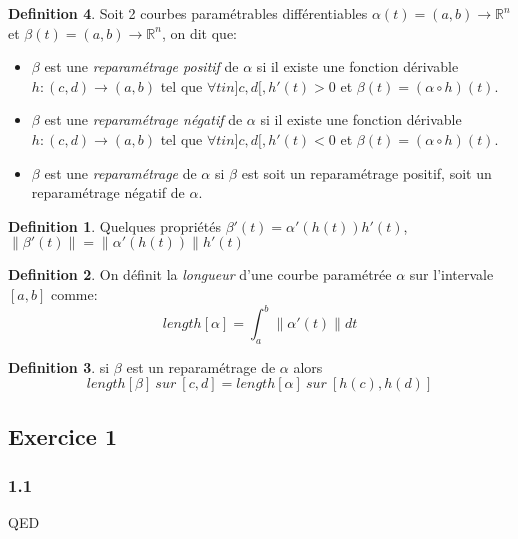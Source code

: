 \documentclass[]{book}
\theoremstyle{definition}
\newtheorem{defn}{Definition}
\newcommand{\bb}[1]{\mathbb{#1}}
\newcommand{\R}{\bb{R}}
\begin{document}
\begin{defn}
Soit 2 courbes param\'etrables diff\'erentiables $\alpha(t) = (a,b) \to \R^n$ et $\beta(t) = (a,b) \to \R^n$, on dit que:
\begin{itemize}
\item $\beta$ est une \emph{reparam\'etrage positif} de $\alpha$ si il existe une fonction d\'erivable $h: (c,d) \to (a,b)$ tel que $\forall t in ]c,d[, h'(t) > 0$ et $\beta(t) = (\alpha \circ h)(t)$. 
\item $\beta$ est une \emph{reparam\'etrage n\'egatif} de $\alpha$ si il existe une fonction d\'erivable $h: (c,d) \to (a,b)$ tel que $\forall t in ]c,d[, h'(t) < 0$ et $\beta(t) = (\alpha \circ h)(t)$. 
\item $\beta$ est une \emph{reparam\'etrage} de $\alpha$ si $\beta$ est soit un reparam\'etrage positif, soit un reparam\'etrage n\'egatif de $\alpha$. 
\end{itemize}

 
\begin{defn}
Quelques propri\'et\'es $\beta'(t) = \alpha'(h(t))h'(t)$, $\lVert \beta'(t)\rVert = \lVert\alpha'(h(t))\rVert h'(t)$
\end{defn}
 

\begin{defn}
On d\'efinit la \emph{longueur} d'une courbe param\'etr\'ee $\alpha$ sur l'intervale $[a,b]$ comme:
$$length[\alpha] = \int_a^b \lVert \alpha'(t)\rVert dt$$
\end{defn}

\begin{defn}
si $\beta$ est un reparam\'etrage de $\alpha$ alors
$$length[\beta] \ sur\ [c,d] = length[\alpha]  \ sur\ [h(c),h(d)]$$ 
\end{defn}
 
 
\end{defn}



\subsection*{Exercice 1}

\subsubsection*{1.1}


QED
\end{document}
